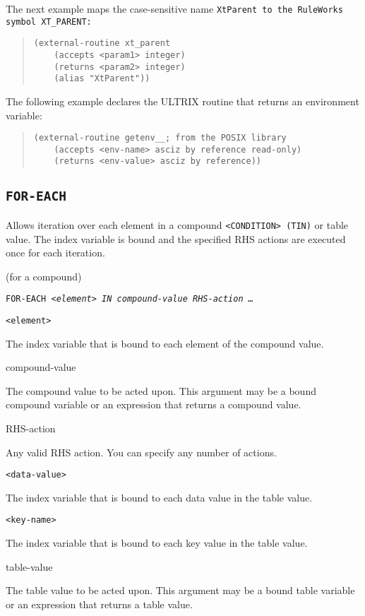 The next example maps the case-sensitive name \tt{XtParent} to the
RuleWorks symbol \verb|XT_PARENT|:

\begin{quote}
\begin{verbatim}
(external-routine xt_parent
    (accepts <param1> integer)
    (returns <param2> integer)
    (alias "XtParent"))
\end{verbatim}
\end{quote} 

The following example declares the ULTRIX routine that
returns an environment variable:

\begin{quote}
\begin{verbatim}
(external-routine getenv__; from the POSIX library
    (accepts <env-name> asciz by reference read-only)
    (returns <env-value> asciz by reference))
\end{verbatim}
\end{quote}

\subsection{\tt{FOR-EACH}}

Allows iteration over each element in a compound
\verb|<CONDITION> (TIN)| or table value. The index variable is bound
and the specified RHS actions are executed once for each iteration.

\Format (for a compound)

\tt{FOR-EACH} \verb|<|\it{element}\verb|>| \tt{IN} \it{compound-value}
\it{RHS-action} \ldots

\begin{arguments}
\item[\tt{<}element\tt{>}]

  The index variable that is bound to each element of the compound
  value.

\item[compound-value]

  The compound value to be acted upon. This argument may be a bound
  compound variable or an expression that returns a compound value.

\item[RHS-action]

  Any valid RHS action. You can specify any number of actions.

\item[\tt{<}data-value\tt{>}]

  The index variable that is bound to each data value in the table
  value.

\item[\tt{<}key-name\tt{>}]

  The index variable that is bound to each key value in the table
  value.

\item[table-value]

  The table value to be acted upon. This argument may be a bound table
  variable or an expression that returns a table value.
\end{arguments}

